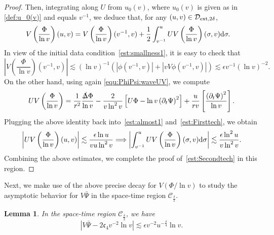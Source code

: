 \documentclass[a4paper,reqno]{amsart}
\newtheorem{lemma}[theorem]{Lemma}
\theoremstyle{definition}
\numberwithin{equation}{section}
\def \d {{\rm{d}}}
\def \pt{\partial_{t}}
\def\Deltas{\slashed{\Delta}}
\def\ep{\epsilon}
\begin{document}
\begin{proof}
\smallskip
Then, integrating along $U$ from $u_{0}(v)$, where $u_0(v)$ is given as in \eqref{def:u_0(v)} and equals $v^{-1}$, 
we deduce that, for any $(u,v)\in \mathcal{D}_{\rm{ext},2\delta}$,
\begin{equation*}
\begin{aligned}
    V\left(\frac{\Phi}{\ln v}\right)(u,v)
    &=V\left(\frac{\Phi}{\ln v}\right)(v^{-1},v)+\frac{1}{2}\int_{v^{-1}}^{u}UV\left(\frac{\Phi}{\ln v}\right)(\sigma,v)\d \sigma.
    \end{aligned}
\end{equation*}
In view of the initial data condition~\eqref{est:smallness1}, it is easy to check that
\begin{equation*}
\left|V\left(\frac{\Phi}{\ln v}\right)(v^{-1},v)\right|\lesssim 
(\ln v)^{-1}\left(|\phi(v^{-1},v)|+|vV\phi(v^{-1},v)|\right)\lesssim
\ep v^{-1}(\ln v)^{-2}.
\end{equation*}
On the other hand, using again \eqref{equ:PhiPsi:waveUV}, we compute
\begin{equation*}
UV\left(\frac{\Phi}{\ln v}\right)
=
\frac{1}{r^{2}}\frac{\Deltas\Phi}{\ln v}
-\frac{2}{v\ln ^{2}v}\left[U\Phi-\ln v\left(\pt \Psi\right)^{2}\right]
+\frac{u}{rv}\left[\frac{\left(\pt \Psi\right)^{2}}{\ln v}\right].
\end{equation*}
Plugging the above identity back into~\eqref{est:almost1} and~\eqref{est:Firsttech}, we obtain
\begin{equation*}
\left|UV\left(\frac{\Phi}{\ln v}\right)(u,v)\right|\lesssim 
\frac{\epsilon\ln u}{vu\ln^2 v}
\Longrightarrow 
\left| \int_{v^{-1}}^{u}UV\left(\frac{\Phi}{\ln v}\right)(\sigma,v)\d \sigma\right|\lesssim \frac{\ep \ln^{2} u}{v\ln^{2}v}.
\end{equation*}
Combining the above estimates, we complete the proof of~\eqref{est:Secondtech} in this region.
\end{proof}

Next, we make use of the above precise decay for $V(\Phi/\ln v)$ to study the asymptotic behavior for $V\bar{\Psi}$ in the space-time region $\mathcal{C}_{\frac{\delta}{2}}$.
\begin{lemma}\label{le:VPsiF}
In the space-time region $\mathcal{C}_{\frac{\delta}{2}}$, we have 
\begin{equation}\label{est:VPsiF}
\left|V\bar{\Psi}-
2\mathfrak{c}_{4}v^{-2}\ln v\right|\lesssim 
\ep v^{-2} u^{-\frac{\delta}{4}}\ln v .
\end{equation}
\end{lemma}
\end{document}
